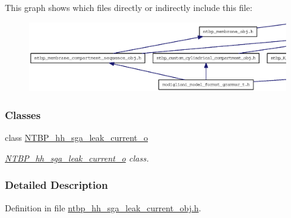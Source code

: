 This graph shows which files directly or indirectly include this file:
\nopagebreak
\begin{figure}[H]
\begin{center}
\leavevmode
\includegraphics[width=400pt]{ntbp__hh__sga__leak__current__obj_8h__dep__incl}
\end{center}
\end{figure}
\subsubsection*{Classes}
\begin{DoxyCompactItemize}
\item 
class \hyperlink{class_n_t_b_p__hh__sga__leak__current__o}{NTBP\_\-hh\_\-sga\_\-leak\_\-current\_\-o}
\begin{DoxyCompactList}\small\item\em \hyperlink{class_n_t_b_p__hh__sga__leak__current__o}{NTBP\_\-hh\_\-sga\_\-leak\_\-current\_\-o} class. \item\end{DoxyCompactList}\end{DoxyCompactItemize}


\subsubsection{Detailed Description}


Definition in file \hyperlink{ntbp__hh__sga__leak__current__obj_8h_source}{ntbp\_\-hh\_\-sga\_\-leak\_\-current\_\-obj.h}.

